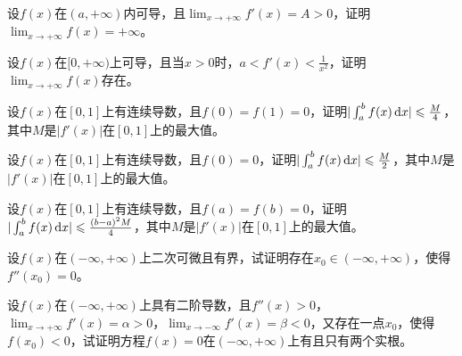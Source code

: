 \begin{example}
	设$f(x)$在$(a,+\infty)$内可导，且$\lim_{x\to+\infty}f'(x)=A>0$，证明$\lim_{x\to+\infty}f(x)=+\infty$。
\end{example}

\begin{example}
	设$f(x)$在$[0,+\infty)$上可导，且当$x>0$时，$a<f'(x)<\frac{1}{x^2}$，证明$\lim_{x\to+\infty}f(x)$存在。
\end{example}

\begin{example}
	设$f(x)$在$[0,1]$上有连续导数，且$f(0)=f(1)=0$，证明$|\int_{a}^{b}f(x)\,\mathrm{d} x|\leqslant\frac{M}{4}$，其中$M$是$|f'(x)|$在$[0,1]$上的最大值。
\end{example}

\begin{example}
	设$f(x)$在$[0,1]$上有连续导数，且$f(0)=0$，证明$|\int_{a}^{b}f(x)\,\mathrm{d} x|\leqslant\frac{M}{2}$，其中$M$是$|f'(x)|$在$[0,1]$上的最大值。
\end{example}

\begin{example}
	设$f(x)$在$[0,1]$上有连续导数，且$f(a)=f(b)=0$，证明$|\int_{a}^{b}f(x)\,\mathrm{d} x|\leqslant\frac{(b-a)^2M}{4}$，其中$M$是$|f'(x)|$在$[0,1]$上的最大值。
\end{example}

\begin{example}
	设$f(x)$在$(-\infty,+\infty)$上二次可微且有界，试证明存在$x_0\in(-\infty,+\infty)$，使得$f''(x_0)=0$。
\end{example}

\begin{example}
	设$f(x)$在$(-\infty,+\infty)$上具有二阶导数，且$f''(x)>0$，$\lim_{x\to+\infty}f'(x)=\alpha>0$，$\lim_{x\to-\infty}f'(x)=\beta<0$，又存在一点$x_0$，使得$f(x_0)<0$，试证明方程$f(x)=0$在$(-\infty,+\infty)$上有且只有两个实根。
\end{example}
